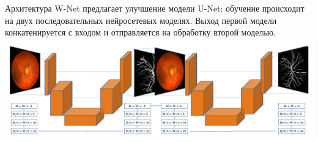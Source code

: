 \documentclass{article}
\begin{document}
Архитектура W-Net предлагает улучшение модели U-Net: обучение происходит на двух последовательных 
нейросетевых моделях. Выход первой модели конкатенируется с входом и отправляется на обработку второй 
моделью.\\

\includegraphics[width=\linewidth]{wnet}\\
\end{document}
